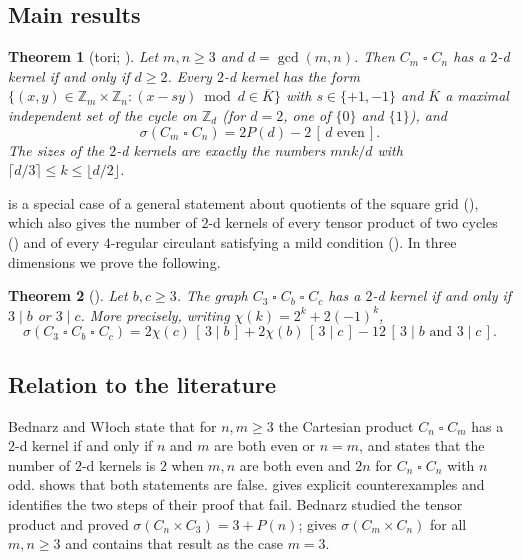 \documentclass[11pt]{article}
\theoremstyle{plain}
\newtheorem{theorem}{Theorem}[section]
\theoremstyle{definition}
\theoremstyle{remark}
\newcommand{\Z}{\mathbb{Z}}
\newcommand{\T}{\mathbin{\square}}
\newcommand{\Per}{P}
\newcommand{\Iv}[1]{[\,#1\,]}
\begin{document}
\subsection{Main results}

\begin{theorem}[tori; ]\label{thm:intro-torus}
Let $m, n \ge 3$ and $d = \gcd(m,n)$. Then $C_m \T C_n$ has a $2$-d kernel if and only if
$d \ge 2$. Every $2$-d kernel has the form
$\{(x,y) \in \Z_m \times \Z_n : (x - sy) \bmod d \in \overline{K}\}$ with $s \in \{+1,-1\}$ and
$\overline{K}$ a maximal independent set of the cycle on $\Z_d$ (for $d = 2$, one of
$\{0\}$ and $\{1\}$), and
\[
\sigma(C_m \T C_n) = 2\Per(d) - 2\,\Iv{d \text{ even}} .
\]
The sizes of the $2$-d kernels are exactly the numbers $mnk/d$ with
$\lceil d/3 \rceil \le k \le \lfloor d/2 \rfloor$.
\end{theorem}

 is a special case of a general statement about quotients of the
square grid (), which also gives the number of $2$-d kernels of every tensor
product of two cycles () and of every $4$-regular circulant satisfying a
mild condition (). In three dimensions we prove the following.

\begin{theorem}[]\label{thm:intro-3d}
Let $b, c \ge 3$. The graph $C_3 \T C_b \T C_c$ has a $2$-d kernel if and only if $3 \mid b$
or $3 \mid c$. More precisely, writing $\chi(k) = 2^k + 2(-1)^k$,
\[
\sigma(C_3 \T C_b \T C_c) = 2\chi(c)\,\Iv{3 \mid b} + 2\chi(b)\,\Iv{3 \mid c}
- 12\,\Iv{3 \mid b \text{ and } 3 \mid c} .
\]
\end{theorem}

\subsection{Relation to the literature}

Bednarz and W{\l}och \cite[Theorem~2.5]{BW2016} state that for $n, m \ge 3$ the Cartesian
product $C_n \T C_m$ has a $2$-d kernel if and only if $n$ and $m$ are both even or $n = m$,
and \cite[Corollary~2.6]{BW2016} states that the number of $2$-d kernels is $2$ when $m, n$ are
both even and $2n$ for $C_n \T C_n$ with $n$ odd.  shows that both
statements are false.  gives explicit counterexamples and identifies
the two steps of their proof that fail. Bednarz \cite{Bednarz2021} studied the tensor
product and proved $\sigma(C_n \times C_3) = 3 + \Per(n)$;  gives
$\sigma(C_m \times C_n)$ for all $m, n \ge 3$ and contains that result as the case $m = 3$.
\end{document}
